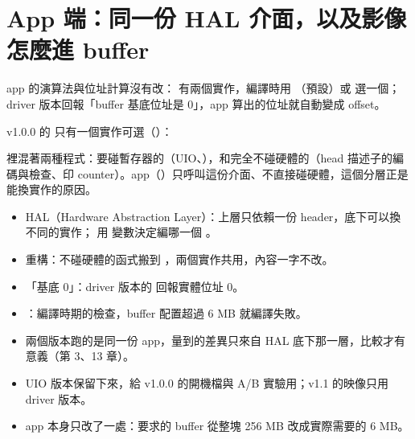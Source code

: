 \section{App 端：同一份 HAL 介面，以及影像怎麼進 buffer}
\label{sec:app}

\begin{oneline}
app 的演算法與位址計算沒有改： 有兩個實作，編譯時用 （預設）或  選一個；driver 版本回報「buffer 基底位址是 0」，app 算出的位址就自動變成 offset。
\end{oneline}

\begin{before}
v1.0.0 的  只有一個實作可選（）：


 裡混著兩種程式：要碰暫存器的（UIO、），和完全不碰硬體的（head 描述子的編碼與檢查、印 counter）。app（）只呼叫這份介面、不直接碰硬體，這個分層正是能換實作的原因。
\end{before}

\begin{tech}
\begin{itemize}
\item HAL（Hardware Abstraction Layer）：上層只依賴一份 header，底下可以換不同的實作； 用  變數決定編哪一個 。
\item 重構：不碰硬體的函式搬到 ，兩個實作共用，內容一字不改。
\item 「基底 0」：driver 版本的  回報實體位址 0。
\item {}：編譯時期的檢查，buffer 配置超過 6 MB 就編譯失敗。
\end{itemize}
\end{tech}

\begin{gain}
\begin{itemize}
\item 兩個版本跑的是同一份 app，量到的差異只來自 HAL 底下那一層，比較才有意義（第 3、13 章）。
\item UIO 版本保留下來，給 v1.0.0 的開機檔與 A/B 實驗用；v1.1 的映像只用 driver 版本。
\item app 本身只改了一處：要求的 buffer 從整塊 256 MB 改成實際需要的 6 MB。
\end{itemize}
\end{gain}

